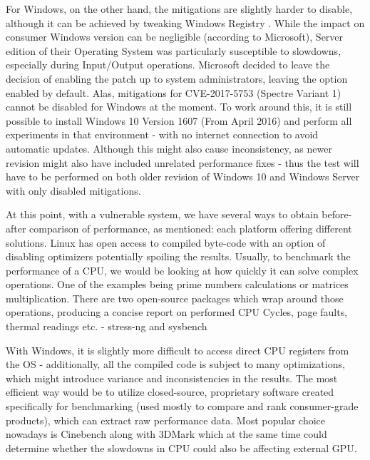 \documentclass{csfourzero}
\begin{document}
For Windows, on the other hand, the mitigations are slightly harder to disable, although it can be achieved by tweaking Windows Registry \cite{msoft}. While the impact on consumer Windows version can be negligible (according to Microsoft\cite{myerson2018understanding}), Server edition of their Operating System was particularly susceptible to slowdowns, especially during Input/Output operations. Microsoft decided to leave the decision of enabling the patch up to system administrators, leaving the option enabled by default. Alas, mitigations for CVE-2017-5753 (Spectre Variant 1) cannot be disabled for Windows at the moment. To work around this, it is still possible to install Windows 10 Version 1607 (From April 2016) and perform all experiments in that environment - with no internet connection to avoid automatic updates. Although this might also cause inconsistency, as newer revision might also have included unrelated performance fixes - thus the test will have to be performed on both older revision of Windows 10 and Windows Server with only disabled mitigations.

At this point, with a vulnerable system, we have several ways to obtain before-after comparison of performance, as mentioned: each platform offering different solutions. Linux has open access to compiled byte-code with an option of disabling optimizers potentially spoiling the results. Usually, to benchmark the performance of a CPU, we would be looking at how quickly it can solve complex operations. One of the examples being prime numbers calculations or matrices multiplication. There are two open-source packages which wrap around those operations, producing a concise report on performed CPU Cycles, page faults, thermal readings etc. - stress-ng \cite{stressng} and sysbench \cite{sysbench}  

With Windows, it is slightly more difficult to access direct CPU registers from the OS - additionally, all the compiled code is subject to many optimizations, which might introduce variance and inconsistencies in the results. The most efficient way would be to utilize closed-source, proprietary software created specifically for benchmarking (used mostly to compare and rank consumer-grade products), which can extract raw performance data. Most popular choice nowadays is Cinebench along with 3DMark which at the same time could determine whether the slowdowns in CPU could also be affecting external GPU. 



\end{document}
